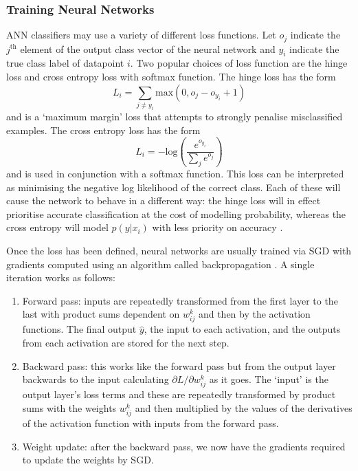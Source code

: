 \subsubsection{Training Neural Networks}

ANN classifiers may use a variety of different loss functions. 
Let $o_{j}$ indicate the $j^{\mathrm{th}}$ element of the output class vector of the neural network and $y_{i}$ indicate the true class label of datapoint $i$. 
Two popular choices of loss function \cite{CS231n} are the hinge loss and cross entropy loss with softmax function.
The hinge loss has the form
\begin{equation}
    L_{i} = \sum_{j\neq{}y_{i}}\mathrm{max}(0,o_{j}-o_{y_{i}} + 1)
\end{equation}
and is a `maximum margin' loss that attempts to strongly penalise misclassified examples. 
The cross entropy loss has the form
\begin{equation}
    L_{i} = -\mathrm{log}\left(
        \frac{e^{o_{y_{i}}}}
        {\sum_{j}e^{o_{j}}}\right)
\end{equation}
and is used in conjunction with a softmax function. This loss can be interpreted as minimising the negative log likelihood of the correct class.
Each of these will cause the network to behave in a different way: the hinge loss will in effect prioritise accurate classification at the cost of modelling probability, whereas the cross entropy will model $p(y|x_{i})$ with less priority on accuracy \cite{CS231n}.

Once the loss has been defined, neural networks are usually trained via SGD with gradients computed using an algorithm called backpropagation \cite{Backprop}. A single iteration works as follows:
\begin{enumerate}[noitemsep]
    \item Forward pass: inputs are repeatedly transformed from the first layer to the last with product sums dependent on $w_{ij}^{k}$ and then by the activation functions. The final output $\hat{y}$, the input to each activation, and the outputs from each activation are stored for the next step. 
    \item Backward pass: this works like the forward pass but from the output layer backwards to the input calculating $\partial{L}/\partial{w_{ij}^{k}}$ as it goes. The `input' is the output layer's loss terms and these are repeatedly transformed by product sums with the weights $w_{ij}^{k}$ and then multiplied by the values of the derivatives of the activation function with inputs from the forward pass.  
    \item Weight update: after the backward pass, we now have the gradients required to update the weights by SGD.
\end{enumerate}


